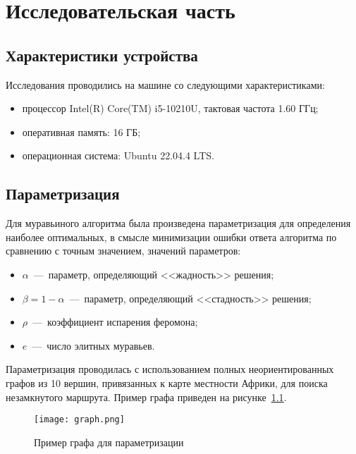 \chapter{Исследовательская часть}
\section{Характеристики устройства}

Исследования проводились на машине со следующими характеристиками:
\begin{itemize}[label=---]
	\item процессор Intel(R) Core(TM) i5-10210U, тактовая частота 1.60 ГГц;
	\item оперативная память: 16 ГБ;
	\item операционная система: Ubuntu 22.04.4 LTS.
\end{itemize}

\section{Параметризация}

Для муравьиного алгоритма была произведена параметризация для определения наиболее оптимальных, в смысле минимизации ошибки ответа алгоритма по сравнению с точным значением, значений параметров:
\begin{itemize}
	\item $\alpha$~---~параметр, определяющий <<жадность>> решения;
	\item $\beta = 1 - \alpha$~---~параметр, определяющий <<стадность>> решения;
	\item $\rho$~---~коэффициент испарения феромона;
	\item $e$~---~число элитных муравьев.
\end{itemize}

Параметризация проводилась с использованием полных неориентированных графов из 10 вершин, привязанных к карте местности Африки, для поиска незамкнутого маршрута. Пример графа приведен на рисунке~\ref{fig:graph}.

\begin{figure}[H]
	\centering
	\texttt{[image: graph.png]}
	\caption{Пример графа для параметризации}
	\label{fig:graph}
\end{figure}

